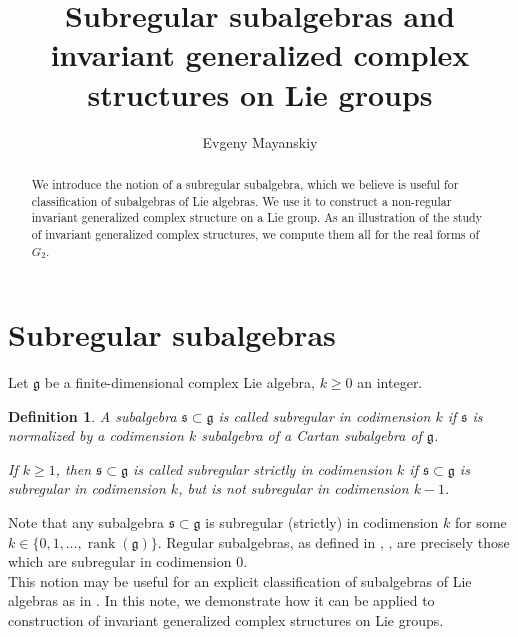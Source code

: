 \documentclass[10pt]{article}
\newtheorem{definition}[theorem]{Definition}
\begin{document}
\nocite{*}

\title{Subregular subalgebras and invariant generalized complex structures on Lie groups}

\author{Evgeny Mayanskiy}

\maketitle

\begin{abstract}
  We introduce the notion of a subregular subalgebra, which we believe is useful for classification of subalgebras of Lie algebras. We use it to construct a non-regular invariant generalized complex structure on a Lie group. As an illustration of the study of invariant generalized complex structures, we compute them all for the real forms of $G_2$. 
\end{abstract}

\section{Subregular subalgebras}

Let $\mathfrak{g}$ be a finite-dimensional complex Lie algebra, $k\geq 0$ an integer.

\begin{definition}
A subalgebra $\mathfrak{s}\subset \mathfrak{g}$ is called \textit{subregular} \textit{in codimension $k$} if $\mathfrak{s}$ is normalized by a codimension $k$ subalgebra of a Cartan subalgebra of $\mathfrak{g}$.

If $k\geq 1$, then $\mathfrak{s}\subset \mathfrak{g}$ is called \textit{subregular} \textit{strictly} \textit{in codimension $k$} if $\mathfrak{s}\subset \mathfrak{g}$ is subregular in codimension $k$, but is not subregular in codimension $k-1$.
\end{definition}

Note that any subalgebra $\mathfrak{s}\subset \mathfrak{g}$ is subregular (strictly) in codimension $k$ for some $k\in \{ 0,1,\ldots , \operatorname{rank}(\mathfrak{g})  \}$. Regular subalgebras, as defined in \cite{Chebotarev}, \cite{Dynkin}, are precisely those which are subregular in codimension $0$.\\

This notion may be useful for an explicit classification  of subalgebras of Lie algebras as in \cite{Mayanskiy}. In this note, we demonstrate how it can be applied to construction of invariant generalized complex structures on Lie groups.
\end{document}

